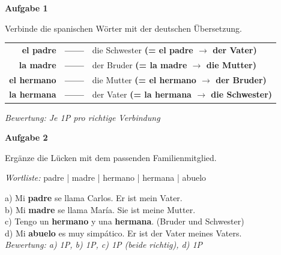 \documentclass[11pt, a4paper]{article}
\newcommand{\fachfarbe}{spanisch}
\newcommand{\punktebox}[1]{\hfill\fbox{\small \_/#1}}
\newcommand{\loesung}[1]{\textcolor{loesung}{\textbf{#1}}}
\newcommand{\es}[1]{\textcolor{\fachfarbe}{\textbf{#1}}}
\newenvironment{aufgabe}[1]{%
    \needspace{5\baselineskip}%
    \nopagebreak[4]%
    \vspace{10pt}
    \noindent\textbf{\textcolor{\fachfarbe}{Aufgabe #1}}
    \nopagebreak[4]%
    \vspace{5pt}
    \nopagebreak[4]%
    \begin{list}{}{\leftmargin=0pt}
    \item[]
}{%
    \end{list}
}
\begin{document}
\begin{aufgabe}{1}
Verbinde die spanischen Wörter mit der deutschen Übersetzung. \punktebox{4}
\end{aufgabe}

\begin{center}
\begin{tabular}{rcl}
\es{el padre} & \loesung{------} & die Schwester \loesung{(= el padre $\rightarrow$ der Vater)} \\[0.8em]
\es{la madre} & \loesung{------} & der Bruder \loesung{(= la madre $\rightarrow$ die Mutter)} \\[0.8em]
\es{el hermano} & \loesung{------} & die Mutter \loesung{(= el hermano $\rightarrow$ der Bruder)} \\[0.8em]
\es{la hermana} & \loesung{------} & der Vater \loesung{(= la hermana $\rightarrow$ die Schwester)} \\
\end{tabular}
\end{center}

\textit{\textcolor{grau}{Bewertung: Je 1P pro richtige Verbindung}}

\vspace{15pt}


\begin{aufgabe}{2}
Ergänze die Lücken mit dem passenden Familienmitglied. \punktebox{4}
\end{aufgabe}

\begin{vokabelkasten}
\textit{Wortliste:} padre | madre | hermano | hermana | abuelo
\end{vokabelkasten}

\vspace{0.5em}

\noindent
a) Mi \loesung{padre} se llama Carlos. Er ist mein Vater. \\[0.8em]
b) Mi \loesung{madre} se llama María. Sie ist meine Mutter. \\[0.8em]
c) Tengo un \loesung{hermano} y una \loesung{hermana}. (Bruder und Schwester) \\[0.8em]
d) Mi \loesung{abuelo} es muy simpático. Er ist der Vater meines Vaters. \\

\textit{\textcolor{grau}{Bewertung: a) 1P, b) 1P, c) 1P (beide richtig), d) 1P}}
\end{document}

